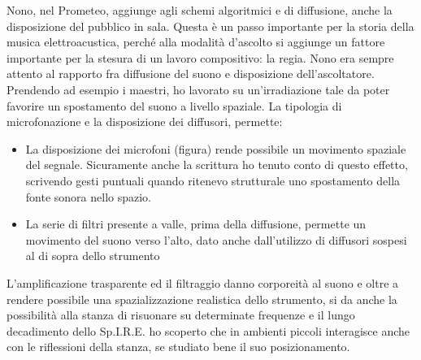 Nono, nel Prometeo, aggiunge agli schemi algoritmici e di diffusione, anche la disposizione del pubblico in sala. Questa è un passo importante per la storia della musica elettroacustica, perché alla modalità d'ascolto si aggiunge un fattore importante per la stesura di un lavoro compositivo: la regia. Nono era sempre attento al rapporto fra diffusione del suono e disposizione dell'ascoltatore. \\
Prendendo ad esempio i maestri, ho lavorato su un'irradiazione tale da poter favorire un spostamento del suono a livello spaziale. La tipologia di microfonazione e la disposizione dei diffusori, permette:
\begin{itemize}
\item{La disposizione dei microfoni (figura) rende possibile un movimento spaziale del segnale. Sicuramente anche la scrittura ho tenuto conto di questo effetto, scrivendo gesti puntuali quando ritenevo strutturale uno spostamento della fonte sonora nello spazio.}
\item{La serie di filtri presente a valle, prima della diffusione, permette un movimento del suono verso l'alto, dato anche dall'utilizzo di diffusori sospesi al di sopra dello strumento}
\end{itemize}

L'amplificazione trasparente ed il filtraggio danno corporeità al suono e oltre a rendere possibile una spazializzazione realistica dello strumento, si da anche la possibilità alla stanza di risuonare su determinate frequenze e il lungo decadimento dello Sp.I.R.E. ho scoperto che in ambienti piccoli interagisce anche con le riflessioni della stanza, se studiato bene il suo posizionamento.
